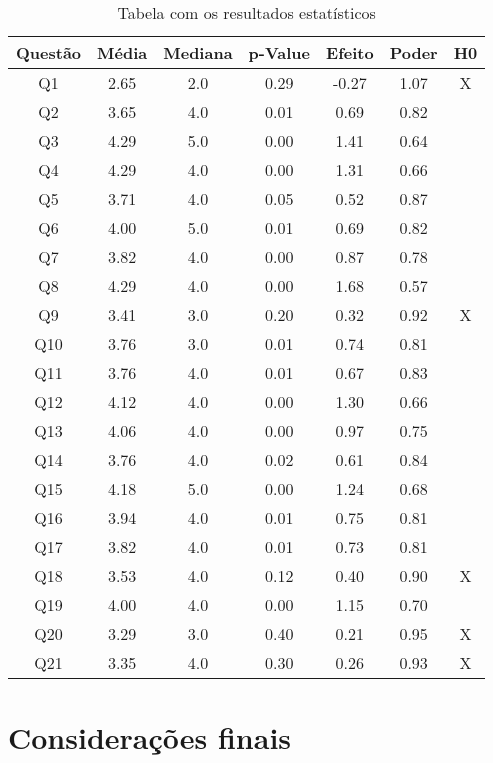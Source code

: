 \begin{table}[htbp]
    \centering
    \caption{Tabela com os resultados estatísticos}
    \label{tab:estatisticas}
    \footnotesize
    \begin{tabular}{|c|c|c|c|c|c|c|}
        \hline
        \cellcolor{green!25} \textbf{Questão} & \cellcolor{green!25} \textbf{Média} & \cellcolor{green!25} \textbf{Mediana} & \cellcolor{green!25} \textbf{p-Value} & \cellcolor{green!25} \textbf{Efeito} & \cellcolor{green!25} \textbf{Poder} & \cellcolor{green!25} \textbf{H0} \\
        \hline
        Q1 & 2.65 & 2.0 & 0.29 & -0.27 & 1.07 & X \\
        Q2 & 3.65 & 4.0 & 0.01 & 0.69 & 0.82 &  \\
        Q3 & 4.29 & 5.0 & 0.00 & 1.41 & 0.64 &  \\
        Q4 & 4.29 & 4.0 & 0.00 & 1.31 & 0.66 &  \\
        Q5 & 3.71 & 4.0 & 0.05 & 0.52 & 0.87 &  \\
        Q6 & 4.00 & 5.0 & 0.01 & 0.69 & 0.82 &  \\
        Q7 & 3.82 & 4.0 & 0.00 & 0.87 & 0.78 &  \\
        Q8 & 4.29 & 4.0 & 0.00 & 1.68 & 0.57 &  \\
        Q9 & 3.41 & 3.0 & 0.20 & 0.32 & 0.92 & X \\
        Q10 & 3.76 & 3.0 & 0.01 & 0.74 & 0.81 &  \\
        Q11 & 3.76 & 4.0 & 0.01 & 0.67 & 0.83 &  \\
        Q12 & 4.12 & 4.0 & 0.00 & 1.30 & 0.66 &  \\
        Q13 & 4.06 & 4.0 & 0.00 & 0.97 & 0.75 &  \\
        Q14 & 3.76 & 4.0 & 0.02 & 0.61 & 0.84 &  \\
        Q15 & 4.18 & 5.0 & 0.00 & 1.24 & 0.68 &  \\
        Q16 & 3.94 & 4.0 & 0.01 & 0.75 & 0.81 &  \\
        Q17 & 3.82 & 4.0 & 0.01 & 0.73 & 0.81 &  \\
        Q18 & 3.53 & 4.0 & 0.12 & 0.40 & 0.90 & X \\
        Q19 & 4.00 & 4.0 & 0.00 & 1.15 & 0.70 &  \\
        Q20 & 3.29 & 3.0 & 0.40 & 0.21 & 0.95 & X \\
        Q21 & 3.35 & 4.0 & 0.30 & 0.26 & 0.93 & X \\
        \hline
    \end{tabular}\normalsize
\end{table}



\section{Considerações finais}

